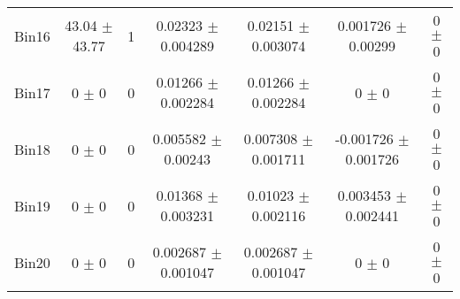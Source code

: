 \begin{tabular}{@{\extracolsep{4pt}}lcccccc@{}}
     Bin16 & 43.04 $\pm$ 43.77 & 1 & 0.02323 $\pm$ 0.004289 & 0.02151 $\pm$ 0.003074 & 0.001726 $\pm$ 0.00299 & 0 $\pm$ 0 \\ 
     Bin17 & 0 $\pm$ 0 & 0 & 0.01266 $\pm$ 0.002284 & 0.01266 $\pm$ 0.002284 & 0 $\pm$ 0 & 0 $\pm$ 0 \\ 
     Bin18 & 0 $\pm$ 0 & 0 & 0.005582 $\pm$ 0.00243 & 0.007308 $\pm$ 0.001711 & -0.001726 $\pm$ 0.001726 & 0 $\pm$ 0 \\ 
     Bin19 & 0 $\pm$ 0 & 0 & 0.01368 $\pm$ 0.003231 & 0.01023 $\pm$ 0.002116 & 0.003453 $\pm$ 0.002441 & 0 $\pm$ 0 \\ 
     Bin20 & 0 $\pm$ 0 & 0 & 0.002687 $\pm$ 0.001047 & 0.002687 $\pm$ 0.001047 & 0 $\pm$ 0 & 0 $\pm$ 0 \\ 
\hline\hline
  \end{tabular}
